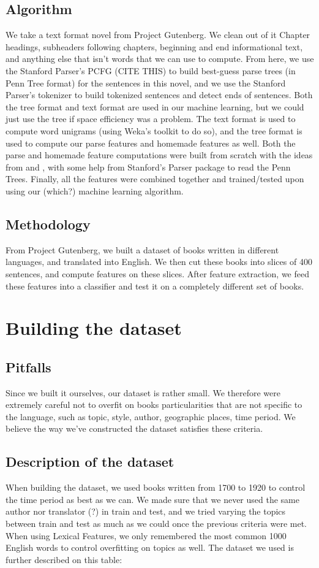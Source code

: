 \documentclass[10pt]{article}
\begin{document}
\subsection{Algorithm}
We take a text format novel from Project Gutenberg. We clean out of it Chapter headings, subheaders following chapters, beginning and end informational text, and anything else that isn't words that we can use to compute. From here, we use the Stanford Parser's PCFG (CITE THIS) to build best-guess parse trees (in Penn Tree format) for the sentences in this novel, and we use the Stanford Parser's tokenizer to build tokenized sentences and detect ends of sentences. Both the tree format and text format are used in our machine learning, but we could just use the tree if space efficiency was a problem. The text format is used to compute word unigrams (using Weka's toolkit to do so), and the tree format is used to compute our parse features and homemade features as well. Both the parse and homemade feature computations were built from scratch with the ideas from  \cite{homemade} and  \cite{Parse}, with some help from Stanford's Parser package to read the Penn Trees. Finally, all the features were combined together and trained/tested upon using our (which?) machine learning algorithm.

\subsection{Methodology}
From Project Gutenberg, we built a dataset of books written in different languages, and translated into English. We then cut these books into slices of 400 sentences, and compute features on these slices. After feature extraction, we feed these features into a classifier and test it on a completely different set of books. 

\section{Building the dataset}
\subsection{Pitfalls}
Since we built it ourselves, our dataset is rather small. We therefore were extremely careful not to overfit on books particularities that are not specific to the language, such as topic, style, author, geographic places, time period. We believe the way we've constructed the dataset satisfies these criteria. 
\subsection{Description of the dataset}
When building the dataset, we used books written from 1700 to 1920 to control the time period as best as we can. We made sure that we never used the same author nor translator (?) in train and test, and we tried varying the topics between train and test as much as we could once the previous criteria were met. When using Lexical Features, we only remembered the most common 1000 English words to control overfitting on topics as well.
The dataset we used is further described on this table:
\end{document}
